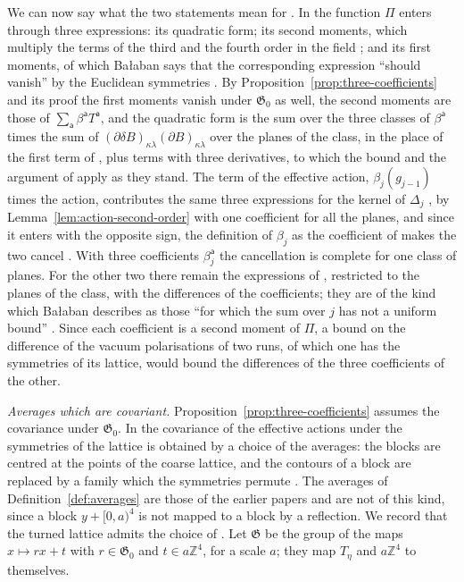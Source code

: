 \documentclass[11pt]{preprint}
\numberwithin{equation}{section}
\theoremstyle{definition}
\theoremstyle{remark}
\theoremstyle{plain}
\begin{document}
We can now say what the two statements mean for \cite{BalabanRG1}. In \cite[(4.34)]{BalabanRG1} the function $\Pi$ enters through three expressions: its quadratic form; its second moments, which multiply the terms of the third and the fourth order in the field \cite[(4.43), (4.44)]{BalabanRG1}; and its first moments, of which Ba{\l}aban says that the corresponding expression ``should vanish'' by the Euclidean symmetries \cite[p.~290]{BalabanRG1}. By Proposition~\ref{prop:three-coefficients} and its proof the first moments vanish under $\mathfrak G_0$ as well, the second moments are those of $\sum_{\mathsf a}\beta^{\mathsf a}T^{\mathsf a}$, and the quadratic form is the sum over the three classes of $\beta^{\mathsf a}$ times the sum of $(\partial\delta B)_{\kappa\lambda}(\partial B)_{\kappa\lambda}$ over the planes of the class, in the place of the first term of \cite[(5.43)]{BalabanRG1}, plus terms with three derivatives, to which the bound \cite[(5.44)]{BalabanRG1} and the argument of \cite[p.~298]{BalabanRG1} apply as they stand. The term \cite[(4.38)]{BalabanRG1} of the effective action, $\beta_j(g_{j-1})$ times the action, contributes the same three expressions for the kernel of $\Delta_j$ \cite[(4.39)--(4.45)]{BalabanRG1}, by Lemma~\ref{lem:action-second-order} with one coefficient for all the planes, and since it enters \cite[(1.6)]{BalabanRG1} with the opposite sign, the definition of $\beta_j$ as the coefficient of \cite[(5.43)]{BalabanRG1} makes the two cancel \cite[pp.~292, 298]{BalabanRG1}. With three coefficients $\beta^{\mathsf a}_j$ the cancellation is complete for one class of planes. For the other two there remain the expressions of \cite[(4.42), (4.44)]{BalabanRG1}, restricted to the planes of the class, with the differences of the coefficients; they are of the kind which Ba{\l}aban describes as those ``for which the sum over $j$ has not a uniform bound'' \cite[p.~292]{BalabanRG1}. Since each coefficient is a second moment of $\Pi$, a bound on the difference of the vacuum polarisations of two runs, of which one has the symmetries of its lattice, would bound the differences of the three coefficients of the other.

\emph{Averages which are covariant.} Proposition~\ref{prop:three-coefficients} assumes the covariance under $\mathfrak G_0$. In \cite{BalabanRG1} the covariance of the effective actions under the symmetries of the lattice is obtained by a choice of the averages: the blocks are centred at the points of the coarse lattice, and the contours of a block are replaced by a family which the symmetries permute \cite[(0.3), (0.4), pp.~252--253]{BalabanRG1}. The averages of Definition~\ref{def:averages} are those of the earlier papers and are not of this kind, since a block $y + [0, a)^4$ is not mapped to a block by a reflection. We record that the turned lattice admits the choice of \cite{BalabanRG1}. Let $\mathfrak G$ be the group of the maps $x \mapsto rx + t$ with $r \in \mathfrak G_0$ and $t \in a\mathbb Z^4$, for a scale $a$; they map $T_\eta$ and $a\mathbb Z^4$ to themselves.
\end{document}
